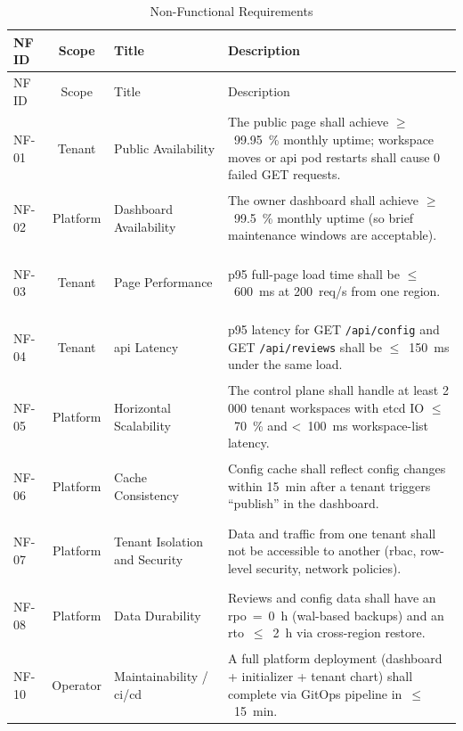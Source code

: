\documentclass[11pt, a4paper, oneside, listof=totoc]{scrartcl}
\begin{document}
                \renewcommand{\arraystretch}{1.5}
                \begin{longtable}{@{}lcp{4cm}P{8cm}@{}}
                    \toprule
                    NF ID & Scope & Title & Description \\
                    \midrule
                    \endfirsthead

                    \toprule
                    NF ID & Scope & Title & Description \\
                    \midrule
                    \endhead

                    \bottomrule
                    \endfoot

                    \bottomrule
                    \caption{Non-Functional Requirements}\label{tab:nfr}
                    \endlastfoot

                    \hypertarget{nf1}{NF-01} & Tenant & Public Availability & The public page shall achieve $\geq$~99.95~\% monthly uptime; workspace moves or \gls{api} pod restarts shall cause 0 failed GET requests. \\
                    \hypertarget{nf2}{NF-02} & Platform & Dashboard Availability & The owner dashboard shall achieve $\geq$~99.5~\% monthly uptime (so brief maintenance windows are acceptable). \\
                    \hypertarget{nf3}{NF-03} & Tenant & Page Performance & p95 full-page load time shall be $\leq$~600~ms at 200~req/s from one region. \\
                    \hypertarget{nf4}{NF-04} & Tenant & \gls{api} Latency & p95 latency for GET \texttt{/api/config} and GET \texttt{/api/reviews} shall be $\leq$~150~ms under the same load. \\
                    \hypertarget{nf5}{NF-05} & Platform & Horizontal Scalability & The control plane shall handle at least 2 000 tenant workspaces with etcd IO $\leq$~70~\% and <~100~ms workspace-list latency. \\
                    \hypertarget{nf6}{NF-06} & Platform & Cache Consistency & Config cache shall reflect config changes within 15~min after a tenant triggers “publish” in the dashboard. \\
                    \hypertarget{nf7}{NF-07} & Platform & Tenant Isolation and Security & Data and traffic from one tenant shall not be accessible to another (\gls{rbac}, row-level security, network policies). \\
                    \hypertarget{nf8}{NF-08} & Platform & Data Durability & Reviews and config data shall have an \gls{rpo}~=~0~h (\gls{wal}-based backups) and an \gls{rto}~$\leq$~2~h via cross-region restore. \\
                    \hypertarget{nf10}{NF-10} & Operator & Maintainability / \gls{ci}/\gls{cd} & A full platform deployment (dashboard + initializer + tenant chart) shall complete via GitOps pipeline in~$\leq$~15~min. \\

                \end{longtable}
\end{document}
